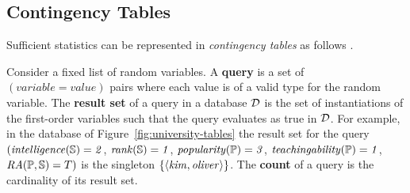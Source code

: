 \documentclass{acm_proc_article-sp}
\begin{document}
\begin{table}[btp] \centering
{}
\caption{Translation from ER Diagram to 
Random Variables. 
 \label{table:translation}}
\end{table}

\subsection{Contingency Tables}
 
Sufficient statistics can be represented in {\em contingency tables} as follows \cite{Moore1998}. 

Consider a fixed list of  random variables.
A \textbf{query} is a set of $(variable = value)$ pairs where each value is of a valid type for the random variable. 
The \textbf{result set} of a query in a database $\D$ is the set of instantiations of the first-order variables such that the query evaluates as true in $\D$.
For example, in the database of Figure~\ref{fig:university-tables} the result set for the query 
$(\it{intelligence}(\S) = 2$, $\it{rank}(\S) = 1$, $\it{popularity}(\P) = 3$, $\it{teachingability}(\P) = 1$, $\ra(\P,\S) = T)$ is the singleton $\{\langle \it{kim}, \it{oliver}\rangle\}$. 
The \textbf{count} of a query is the cardinality of its result set. 
\end{document}
